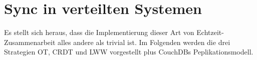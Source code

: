 \section{Sync in verteilten Systemen}
Es stellt sich heraus, dass die Implementierung dieser Art von Echtzeit-Zusammenarbeit alles andere als trivial ist.
Im Folgenden werden die drei Strategien \gls{OT}, \gls{CRDT} und \gls{LWW} vorgestellt plus CouchDBs Peplikationsmodell.
%
%
%

%
%
%
%
%
%
%
%

